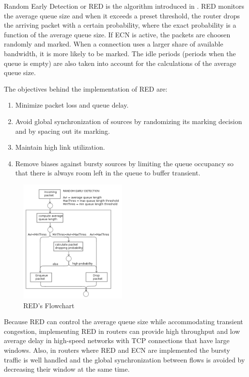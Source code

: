 Random Early Detection or RED is the algorithm introduced in
\cite{FloydJacobsonRED}. RED monitors the average queue size and when it
exceeds a preset threshold, the router drops the arriving packet with a
certain probability, where the exact probability is a function of the average
queue size. If \gls{ECN} is active, the packets are choosen randomly and marked. When
a connection uses a larger share of available bandwidth, it is more likely to
be marked. The idle periods (periods when the queue is empty) are also taken
into account for the calculations of the average queue size.

The objectives behind the  implementation of RED are:
\begin{enumerate}
\item Minimize packet loss and queue delay.
\item Avoid global synchronization of sources by randomizing its marking
decision and by spacing out its marking.
\item Maintain high link utilization.
\item Remove biases against bursty sources by limiting the queue occupancy so
that there is always room left in the queue to buffer transient.
\end{enumerate}

\begin{figure}
  \begin{center}
    \includegraphics[width=0.48\textwidth]{img/RED}
  \end{center}
  \caption{RED's Flowchart}
  \label{fig:RED}
\end{figure}

Because RED can control the average queue size while accommodating transient
congestion, implementing RED in routers can provide high throughput and low
average delay in high-speed networks with TCP connections that have large
windows. Also, in routers where RED and ECN are implemented the bursty traffic
is well handled and the global synchronization between flows is avoided by
decreasing their window at the same time.

